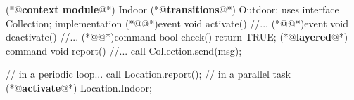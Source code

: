 
\begin{Sbox}
\begin{minipage}{\marginparwidth}
\begin{csource}
(*@\textbf{context module}@*) Indoor {
(*@\textbf{transitions}@*) Outdoor;
 uses interface Collection;}
implementation {
(*@@*)event void activate(){
  //...}
(*@@*)event void deactivate(){
  //...}
(*@@*)command bool check(){
  return TRUE;}
(*@\textbf{layered}@*) command void report(){
  //...
  call Collection.send(msg);}}
\end{csource}
\end{minipage}
\end{Sbox}

\begin{Sbox}
\begin{minipage}{\marginparwidth}
\begin{csource}
// in a periodic loop...
call Location.report();
// in a parallel task
(*@\textbf{activate}@*) Location.Indoor;
\end{csource}
\end{minipage}
\end{Sbox}



